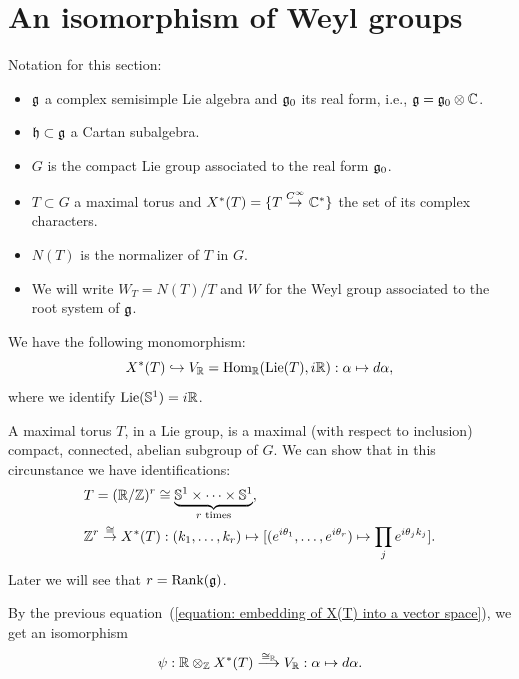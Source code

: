 \section{An isomorphism of Weyl groups}\label{section: isom of Weyl groups}
Notation for this section:
\begin{itemize}
    \item $\mathfrak{g}$ a complex semisimple Lie algebra and $\mathfrak{g}_0$ its real form, i.e., $\mathfrak{g}=\mathfrak{g}_0\otimes\mathbb{C}$.
    \item $\mathfrak{h}\subset \mathfrak{g}$ a Cartan subalgebra.
    \item $G$ is the compact Lie group associated to the real form $\mathfrak{g}_0$.
    \item $T\subset G$ a maximal torus and $X^*(T)=\{T\overset{C^\infty}{\to}\mathbb{C}^*\}$ the set of its complex characters. 
    \item $N(T)$ is the normalizer of $T$ in $G$.
    \item We will write $W_T=N(T)/T$ and $W$ for the Weyl group associated to the root system of $\mathfrak{g}$.
\end{itemize}
We have the following monomorphism: 
    \begin{equation}\label{equation: embedding of X(T) into a vector space}
        X^*(T)\hookrightarrow V_{\mathbb{R}}=\text{Hom}_{\mathbb{R}}(\text{Lie}(T),i\mathbb{R}):\alpha\mapsto d\alpha,
    \end{equation}
where we identify $\text{Lie}(\mathbb{S}^1)=i\mathbb{R}$.
    
\begin{remark}
    A maximal torus $T$, in a Lie group, is a maximal (with respect to inclusion) compact, connected, abelian subgroup 
    of $G$. We can show that in this circunstance we have identifications:
    \begin{equation}
        \begin{aligned}
            &T=(\mathbb{R}/\mathbb{Z})^r\cong\underset{r\text{ times}}{\underbrace{\mathbb{S}^1\times\cdots\times\mathbb{S}^1}},\\
            &\mathbb{Z}^r\overset{\cong}{\to} X^*(T):(k_1,\dots,k_r)
        \mapsto [(e^{i\theta_1},\dots,e^{i\theta_r})\mapsto \prod_j e^{i\theta_jk_j}].
        \end{aligned}
    \end{equation}
    Later we will see that $r=\text{Rank}(\mathfrak{g})$.
\end{remark}
By the previous equation~(\ref{equation: embedding of X(T) into a vector space}), we get an isomorphism
\begin{equation}
    \psi:\mathbb{R}\otimes_{\mathbb{Z}}X^*(T)\overset{\cong_{\mathbb{R}}}{\longrightarrow} 
    V_{\mathbb{R}}:\alpha\mapsto d\alpha.
\end{equation}



